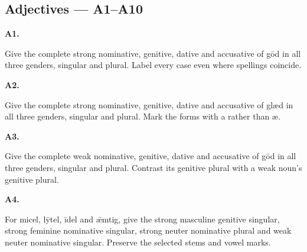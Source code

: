 \subsection*{Adjectives — A1–A10}

\par\begin{minipage}{\linewidth}\raggedright
\textbf{A1.}

Give the complete strong nominative, genitive, dative and accusative of gōd in all three genders, singular and plural. Label every case even where spellings coincide.

\end{minipage}\par\addvspace{4pt}

\par\begin{minipage}{\linewidth}\raggedright
\textbf{A2.}

Give the complete strong nominative, genitive, dative and accusative of glæd in all three genders, singular and plural. Mark the forms with a rather than æ.

\end{minipage}\par\addvspace{4pt}

\par\begin{minipage}{\linewidth}\raggedright
\textbf{A3.}

Give the complete weak nominative, genitive, dative and accusative of gōd in all three genders, singular and plural. Contrast its genitive plural with a weak noun’s genitive plural.

\end{minipage}\par\addvspace{4pt}

\par\begin{minipage}{\linewidth}\raggedright
\textbf{A4.}

For micel, lȳtel, īdel and ǣmtig, give the strong masculine genitive singular, strong feminine nominative singular, strong neuter nominative plural and weak neuter nominative singular. Preserve the selected stems and vowel marks.

\end{minipage}\par\addvspace{4pt}

